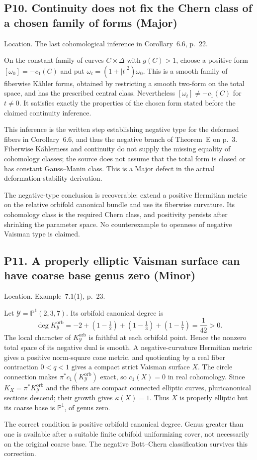 \documentclass[10pt]{article}
\begin{document}
\subsection*{P10. Continuity does not fix the Chern class of a chosen family of forms (Major)}
Location. The last cohomological inference in Corollary 6.6, p. 22.\par
On the constant family of curves \(C\times\Delta\) with \(g(C)>1\), choose a positive form \([\omega_0]=-c_1(C)\) and put \(\omega_t=(1+|t|^2)\omega_0\). This is a smooth family of fiberwise Kähler forms, obtained by restricting a smooth two-form on the total space, and has the prescribed central class. Nevertheless \([\omega_t]\ne-c_1(C)\) for \(t\ne0\). It satisfies exactly the properties of the chosen form stated before the claimed continuity inference.\par
This inference is the written step establishing negative type for the deformed fibers in Corollary 6.6, and thus the negative branch of Theorem E on p. 3. Fiberwise Kählerness and continuity do not supply the missing equality of cohomology classes; the source does not assume that the total form is closed or has constant Gauss–Manin class. This is a Major defect in the actual deformation-stability derivation.\par
The negative-type conclusion is recoverable: extend a positive Hermitian metric on the relative orbifold canonical bundle and use its fiberwise curvature. Its cohomology class is the required Chern class, and positivity persists after shrinking the parameter space. No counterexample to openness of negative Vaisman type is claimed.\par
\subsection*{P11. A properly elliptic Vaisman surface can have coarse base genus zero (Minor)}
Location. Example 7.1(1), p. 23.\par
Let \(\mathcal Y=\mathbb P^1(2,3,7)\). Its orbifold canonical degree is \[\deg K_\mathcal Y^{\mathrm{orb}}
   =-2+\left(1-\tfrac12\right)+\left(1-\tfrac13\right)
                               +\left(1-\tfrac17\right)
   =\frac1{42}>0.\] The local character of \(K_\mathcal Y^{\mathrm{orb}}\) is faithful at each orbifold point. Hence the nonzero total space of its negative dual is smooth. A negative-curvature Hermitian metric gives a positive norm-square cone metric, and quotienting by a real fiber contraction \(0<q<1\) gives a compact strict Vaisman surface \(X\). The circle connection makes \(\pi^*c_1(K_\mathcal Y^{\mathrm{orb}})\) exact, so \(c_1(X)=0\) in real cohomology. Since \(K_X=\pi^*K_\mathcal Y^{\mathrm{orb}}\) and the fibers are compact connected elliptic curves, pluricanonical sections descend; their growth gives \(\kappa(X)=1\). Thus \(X\) is properly elliptic but its coarse base is \(\mathbb P^1\), of genus zero.\par
The correct condition is positive orbifold canonical degree. Genus greater than one is available after a suitable finite orbifold uniformizing cover, not necessarily on the original coarse base. The negative Bott–Chern classification survives this correction.\par
\end{document}

